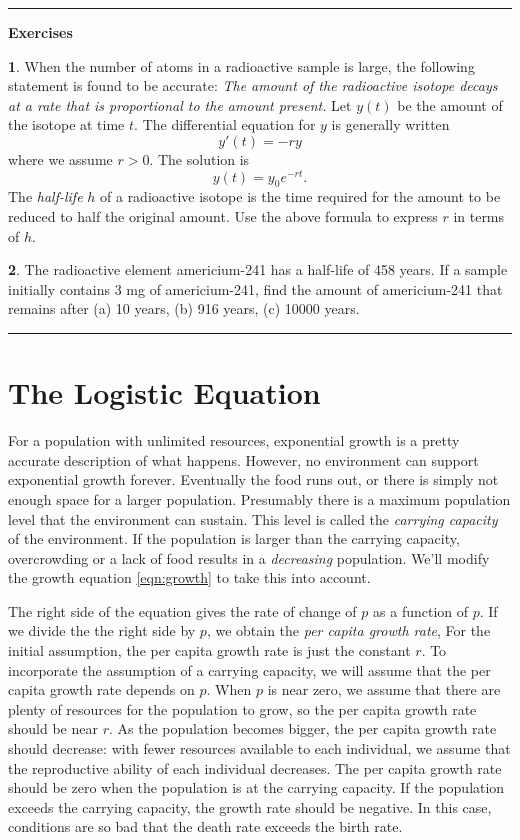 \documentclass[reqno]{immbook}
\numberwithin{equation}{chapter}
\numberwithin{question}{section}
\numberwithin{theorem}{chapter}
\numberwithin{figure}{chapter}
\theoremstyle{definition}
\newtheorem{exercise}{}[section]
\newenvironment{exercises}%
{%
\medskip\hrule\medskip\noindent\textbf{Exercises}%
}%
{%
\medskip\hrule
}
\begin{document}
\newpage

\begin{exercises}
\begin{exercise}
When the number of atoms in a radioactive sample is large,
the following statement is found to be accurate:
\emph{The amount of the radioactive isotope decays at 
a rate that is proportional to the amount present.}
Let $y(t)$ be the amount of the isotope at time $t$.
The differential equation for $y$ is generally written
\[
   y'(t) = -ry
\]
where we assume $r > 0$.  The solution is
\[
   y(t) = y_0 e^{-rt}.
\]
The \emph{half-life} $h$ of a radioactive
isotope is the time required for the amount to be reduced
to half the original amount.
Use the above formula to express $r$ in terms of $h$.
\end{exercise}
\begin{exercise}
The radioactive element americium-241 has a half-life
of 458 years.
If a sample initially contains 3 mg of americium-241,
find the amount of americium-241 that remains
after (a) 10 years, (b) 916 years, (c) 10000 years.
\end{exercise}
\end{exercises}

\newpage

\section{The Logistic Equation}

For a population with unlimited resources, exponential growth
is a pretty accurate description of what happens.
However, no environment can support exponential growth forever.
Eventually the food runs out, or there is simply not enough space
for a larger population.
Presumably there is a maximum population level that the environment
can sustain.  This level is called the
\emph{carrying capacity}
of the environment. If the population is larger than the
carrying capacity, overcrowding or a lack of food results in a
\emph{decreasing} population.
We'll modify the growth equation
\eqref{eqn:growth} to take this into account.

The right side of the equation gives the rate of change of $p$
as a function of $p$.
If we divide the the right side by $p$, we obtain the
\emph{per capita growth rate},
For the initial assumption,
the per capita growth rate  is just the constant $r$.
To incorporate the assumption of a carrying capacity, we will assume that the
per capita growth rate depends on $p$.
When $p$ is near zero, we assume that there
are plenty of resources for the population to grow, so the
per capita growth rate should be
near $r$.  As the population becomes bigger, the per capita growth rate
should decrease: with fewer resources available to each individual,
we assume that the reproductive ability of each individual decreases.
The per capita growth rate
should be zero when the population is at the carrying capacity.
If the population exceeds the carrying capacity, the growth rate should
be negative. In this case, conditions are so bad that the death rate
exceeds the birth rate.
\end{document}
